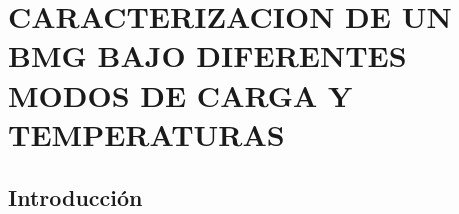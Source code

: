 
\chapter{CARACTERIZACION DE UN BMG BAJO DIFERENTES MODOS DE CARGA Y TEMPERATURAS} %

\label{C3} %




\section{Introducción}
\label{S3_1}

